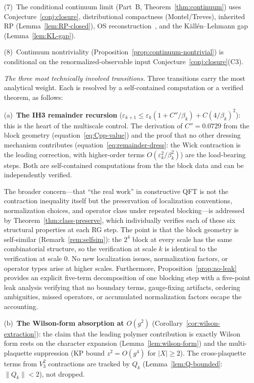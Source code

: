 \documentclass[11pt]{article}
\theoremstyle{definition}
\begin{document}
(7)~The conditional continuum limit (Part~B, Theorem~\ref{thm:continuum}) uses Conjecture~\ref{conj:closure}, distributional compactness (Montel/Treves), inherited RP (Lemma~\ref{lem:RP-closed}), OS reconstruction~\cite{OS73}, and the K\"all\'en--Lehmann gap (Lemma~\ref{lem:KL-gap}).

(8)~Continuum nontriviality (Proposition~\ref{prop:continuum-nontrivial}) is conditional on the renormalized-observable input Conjecture~\ref{conj:closure}(C3).

\emph{The three most technically involved transitions.}
Three transitions carry the most analytical weight.
Each is resolved by a self-contained computation or
a verified theorem, as follows:

(a)~\textbf{The IH3 remainder recursion}
($\varepsilon_{k+1}\le\varepsilon_k(1+C''/\beta_k)+C(4/\beta_k)^2$):
this is the heart of the multiscale control.  The derivation
of $C''=0.0729$ from the block geometry
(equation~\eqref{eq:Cpp-value}) and the proof that no
other dressing mechanism contributes
(equation~\eqref{eq:remainder-dress}: the Wick contraction is the
leading correction, with higher-order terms
$O(\varepsilon_k^2/\beta_k^2)$) are the load-bearing steps.
Both are self-contained computations from the the block
data and can be independently verified.

The broader concern---that ``the real work'' in constructive QFT
is not the contraction inequality itself but the preservation of
localization conventions, normalization choices, and operator class
under repeated blocking---is addressed by
Theorem~\ref{thm:class-preserve}, which individually verifies each
of these six structural properties at each RG step.  The point
is that the block geometry is self-similar
(Remark~\ref{rem:selfsim}): the $2^4$ block at every scale has
the same combinatorial structure, so the verification at scale $k$
is identical to the verification at scale $0$.  No new
localization issues, normalization factors, or operator types arise
at higher scales.  Furthermore, Proposition~\ref{prop:no-leak}
provides an explicit five-term decomposition of one blocking step
with a five-point leak analysis verifying that no boundary terms,
gauge-fixing artifacts, ordering ambiguities, missed operators, or
accumulated normalization factors escape the accounting.

(b)~\textbf{The Wilson-form absorption at $O(g^2)$}
(Corollary~\ref{cor:wilson-extraction}): the claim that the
leading polymer contribution is exactly Wilson form rests on
the character expansion (Lemma~\ref{lem:wilson-form}) and the
multi-plaquette suppression (KP bound $z^2=O(g^4)$ for
$|X|\ge 2$).  The cross-plaquette terms from $V_3^2$
contractions are tracked by $Q_k$
(Lemma~\ref{lem:Q-bounded}: $\|Q_k\|<2$), not dropped.
\end{document}
